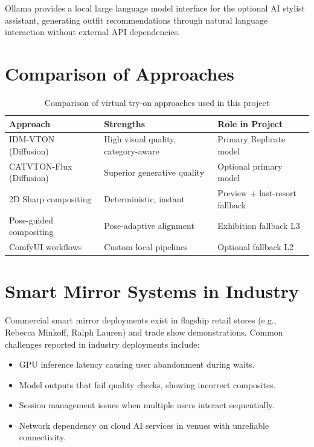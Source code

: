 Ollama provides a local large language model interface for the optional AI stylist assistant, generating outfit recommendations through natural language interaction without external API dependencies.

\section{Comparison of Approaches}
\label{sec:comparison}

\begin{table}[H]
  \centering
  \caption{Comparison of virtual try-on approaches used in this project}
  \label{tab:approach-comparison}
  \begin{tabular}{@{}lp{4.5cm}p{4.5cm}@{}}
    \toprule
    \textbf{Approach} & \textbf{Strengths} & \textbf{Role in Project} \\
    \midrule
    IDM-VTON (Diffusion) & High visual quality, category-aware & Primary Replicate model \\
    CATVTON-Flux (Diffusion) & Superior generative quality & Optional primary model \\
    2D Sharp compositing & Deterministic, instant & Preview + last-resort fallback \\
    Pose-guided compositing & Pose-adaptive alignment & Exhibition fallback L3 \\
    ComfyUI workflows & Custom local pipelines & Optional fallback L2 \\
    \bottomrule
  \end{tabular}
\end{table}

\section{Smart Mirror Systems in Industry}
\label{sec:industry}

Commercial smart mirror deployments exist in flagship retail stores (e.g., Rebecca Minkoff, Ralph Lauren) and trade show demonstrations. Common challenges reported in industry deployments include:

\begin{itemize}[leftmargin=*]
  \item GPU inference latency causing user abandonment during waits.
  \item Model outputs that fail quality checks, showing incorrect composites.
  \item Session management issues when multiple users interact sequentially.
  \item Network dependency on cloud AI services in venues with unreliable connectivity.
\end{itemize}

